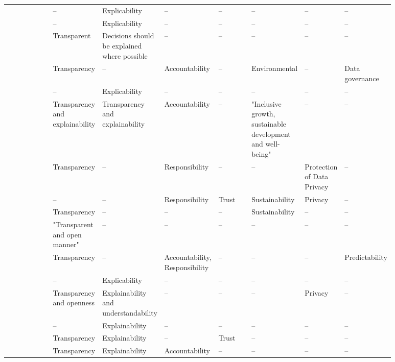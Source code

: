 \begin{landscape}
\begin{ThreePartTable}
\begin{longtable}{P{0.18\linewidth}P{0.1\linewidth}P{0.1\linewidth}P{0.1\linewidth}P{0.1\linewidth}P{0.1\linewidth}P{0.1\linewidth}P{0.1\linewidth}}
        \textcite{Morley_2020} & -- & Explicability & -- & -- & -- & -- & -- \\ 
        \textcite{Morley_2021} & -- & Explicability & -- & -- & -- & -- & -- \\ 
        \textcite{Nauck_2019} & Transparent & Decisions should be explained where possible & -- & -- & -- & -- & -- \\ 
        \textcite{Papagiannidis_2022} & Transparency & -- & Accountability & -- & Environmental & -- & Data governance \\ 
        \textcite{Peters_2020} & -- & Explicability & -- & -- & -- & -- & -- \\ 
        \textcite{Rizinski_2022} & Transparency and explainability & Transparency and explainability & Accountability & -- & "Inclusive growth, sustainable \mbox{development} and well-being" & -- & -- \\ 
        \textcite{Rothenberger_2019} & Transparency & -- & Responsibility & -- & -- & Protection of Data Privacy & -- \\ 
        \textcite{Ryan_2021} & -- & -- & Responsibility & Trust & Sustainability & Privacy & -- \\ 
        \textcite{Siala_2022} & Transparency & -- & -- & -- & Sustainability & -- & -- \\ 
        \textcite{Thelisson_2018} & "Transparent and open manner" & -- & -- & -- & -- & -- & -- \\ 
        \textcite{Vakkuri_2022} & Transparency & -- & Accountability, Responsibility & -- & -- & -- & Predictability \\ 
        \textcite{vanBruxvoort_2021} & -- & Explicability & -- & -- & -- & -- & -- \\ 
        \textcite{Vetro_2019} & Transparency and openness & Explainability and understandability & -- & -- & -- & Privacy & -- \\  
        \textcite{WangW_2021} & -- & Explainability & -- & -- & -- & -- & -- \\ 
        \textcite{WangY_2020} & Transparency & Explainability & -- & Trust & -- & -- & -- \\
        \textcite{Werder_2022} & Transparency & Explainability & Accountability & -- & -- & -- & -- \\ 


\end{longtable}
\end{ThreePartTable}
\end{landscape}
